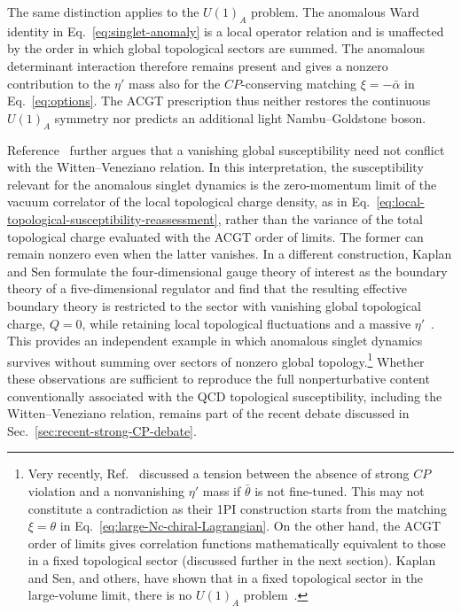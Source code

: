 \documentclass[review]{elsarticle}
\numberwithin{equation}{section}
\numberwithin{table}{section}
\numberwithin{figure}{section}
\begin{document}
The same distinction applies to the $U(1)_A$ problem. The anomalous Ward identity in Eq.~\eqref{eq:singlet-anomaly} is a local operator relation and is unaffected by the order in which global topological sectors are summed. The anomalous determinant interaction therefore remains present and gives a nonzero contribution to the $\eta'$ mass also for the $CP$-conserving matching $\xi=-\bar\alpha$ in Eq.~\eqref{eq:options}. The ACGT prescription thus neither restores the continuous $U(1)_A$ symmetry nor predicts an additional light Nambu--Goldstone boson.

Reference~\cite{Ai:2025quf} further argues that a vanishing global susceptibility need not conflict with the Witten--Veneziano relation. In this interpretation, the susceptibility relevant for the anomalous singlet dynamics is the zero-momentum limit of the vacuum correlator of the local topological charge density, as in Eq.~\eqref{eq:local-topological-susceptibility-reassessment}, rather than the variance of the total topological charge evaluated with the ACGT order of limits. The former can remain nonzero even when the latter vanishes. In a different construction, Kaplan and Sen formulate the four-dimensional gauge theory of interest as the boundary theory of a five-dimensional regulator and find that the resulting effective boundary theory is restricted to the sector with vanishing global topological charge, $Q=0$, while retaining local topological fluctuations and a  massive $\eta'$~\cite{Kaplan:2024ezz}. This provides an independent example in which anomalous singlet dynamics survives without summing over sectors of nonzero global topology.\footnote{Very recently, Ref.~\cite{DiVecchia:2026mrz} discussed a tension between the absence of strong $CP$ violation and a nonvanishing $\eta'$ mass if $\bar\theta$ is not fine-tuned. This may not constitute a contradiction as their 1PI construction starts from the matching $\xi=\theta$ in Eq.~\eqref{eq:large-Nc-chiral-Lagrangian}. On the other hand, the ACGT order of limits gives correlation functions mathematically equivalent to those in a fixed topological sector (discussed further in the next section). Kaplan and Sen, and others, have shown that in a fixed topological sector in the large-volume limit, there is no $U(1)_A$ problem~\cite{Brower:2003yx,Aoki:2007ka,Kaplan:2024ezz}.} Whether these observations are sufficient to reproduce the full nonperturbative content conventionally associated with the QCD topological susceptibility, including the Witten--Veneziano relation, remains part of the recent debate discussed in Sec.~\ref{sec:recent-strong-CP-debate}.
\end{document}
